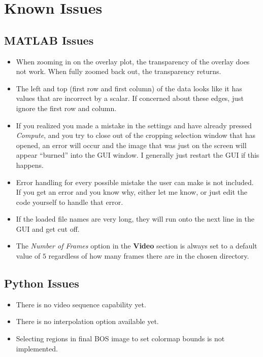 \documentclass[letterpaper,12pt]{article}
\begin{document}
\section{Known Issues}
\label{sec:Known_Issues}

\subsection{MATLAB Issues}
\label{subsec:MATLAB_Issues}

\begin{itemize}
\item When zooming in on the overlay plot, the transparency of the overlay does not work.  When fully zoomed back out, the transparency returns.
\item The left and top (first row and first column) of the data looks like it has values that are incorrect by a scalar.  If concerned about these edges, just ignore the first row and column.
\item If you realized you made a mistake in the settings and have already pressed \textit{Compute}, and you try to close out of the cropping selection window that has opened, an error will occur and the image that was just on the screen will appear ``burned'' into the GUI window.  I generally just restart the GUI if this happens.
\item Error handling for every possible mistake the user can make is not included.  If you get an error and you know why, either let me know, or just edit the code yourself to handle that error.
\item If the loaded file names are very long, they will run onto the next line in the GUI and get cut off.
\item The \textcolor{myBlue}{\textit{Number of Frames}} option in the \textbf{Video} section is always set to a default value of $5$ regardless of how many frames there are in the chosen directory.
\end{itemize}

\subsection{Python Issues}
\label{subsec:Python_Issues}

\begin{itemize}
\item There is no video sequence capability yet.
\item There is no interpolation option available yet.
\item Selecting regions in final BOS image to set colormap bounds is not implemented.
\end{itemize}



\end{document}
